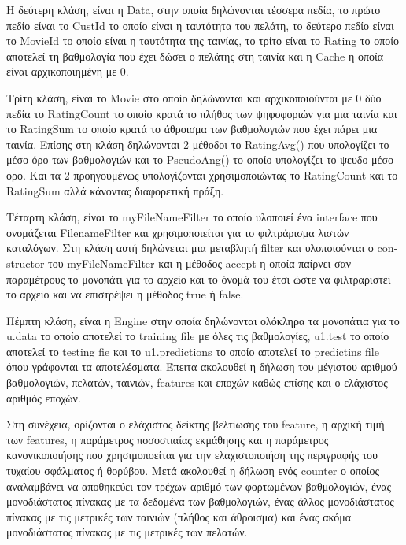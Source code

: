 \documentclass{report}
\begin{document}
Η δεύτερη κλάση, είναι η \textlatin{Data}, στην οποία δηλώνονται τέσσερα πεδία, το πρώτο πεδίο είναι το \textlatin{CustId} το οποίο είναι η ταυτότητα του πελάτη, το δεύτερο πεδίο είναι το \textlatin{MovieId} το οποίο είναι η ταυτότητα της ταινίας, το τρίτο είναι το \textlatin{Rating} το οποίο αποτελεί τη βαθμολογία που έχει δώσει ο πελάτης στη ταινία και η \textlatin{Cache} η οποία είναι αρχικοποιημένη με 0.

Τρίτη κλάση, είναι το \textlatin{Movie} στο οποίο δηλώνονται και αρχικοποιούνται με 0 δύο πεδία το \textlatin{RatingCount} το οποίο κρατά το πλήθος των ψηφοφοριών για μια ταινία και το \textlatin{RatingSum} το οποίο κρατά το άθροισμα των βαθμολογιών που έχει πάρει μια ταινία. Επίσης στη κλάση δηλώνονται 2 μέθοδοι το \textlatin{RatingAvg()} που υπολογίζει το μέσο όρο των βαθμολογιών και το \textlatin{PseudoAng()} το οποίο υπολογίζει το ψευδο-μέσο όρο. Και τα 2 προηγουμένως υπολογίζονται χρησιμοποιώντας το \textlatin{RatingCount} και το \textlatin{RatingSum} αλλά κάνοντας διαφορετική πράξη.

Τέταρτη κλάση, είναι το \textlatin{myFileNameFilter} το οποίο υλοποιεί ένα \textlatin{interface} που ονομάζεται \textlatin{FilenameFilter} και χρησιμοποιείται για το φιλτράρισμα λιστών καταλόγων. Στη κλάση αυτή δηλώνεται μια μεταβλητή \textlatin{filter} και υλοποιούνται ο \textlatin{constructor} του \textlatin{myFileNameFilter} και η μέθοδος \textlatin{accept} η οποία παίρνει σαν παραμέτρους το μονοπάτι για το αρχείο και το όνομά του έτσι ώστε να φιλτραριστεί το αρχείο και να επιστρέψει η μέθοδος \textlatin{true} ή \textlatin{false}. 

Πέμπτη κλάση, είναι η \textlatin{Engine} στην οποία δηλώνονται ολόκληρα τα μονοπάτια για το \textlatin{u.data} το οποίο αποτελεί το \textlatin{training file} με όλες τις βαθμολογίες, \textlatin{u1.test} το οποίο αποτελεί το \textlatin{testing fie} και το \textlatin{u1.predictions} το οποίο αποτελεί το \textlatin{predictins file} όπου γράφονται τα αποτελέσματα. Έπειτα ακολουθεί η δήλωση του μέγιστου αριθμού βαθμολογιών, πελατών, ταινιών, features και εποχών καθώς επίσης και ο ελάχιστος αριθμός εποχών.

Στη συνέχεια, ορίζονται ο ελάχιστος δείκτης βελτίωσης του \textlatin{feature}, η αρχική τιμή των \textlatin{features}, η παράμετρος ποσοστιαίας εκμάθησης και η παράμετρος κανονικοποιήσης που χρησιμοποείται για την ελαχιστοποιήση της περιγραφής του τυχαίου σφάλματος ή θορύβου. Μετά ακολουθεί η δήλωση ενός \textlatin{counter} ο οποίος αναλαμβάνει να αποθηκεύει τον τρέχων αριθμό των φορτωμένων βαθμολογιών, ένας μονοδιάστατος πίνακας με τα δεδομένα των βαθμολογιών, ένας άλλος μονοδιάστατος πίνακας με τις μετρικές των ταινιών (πλήθος και άθροισμα) και ένας ακόμα μονοδιάστατος πίνακας με τις μετρικές των πελατών.
\end{document}
